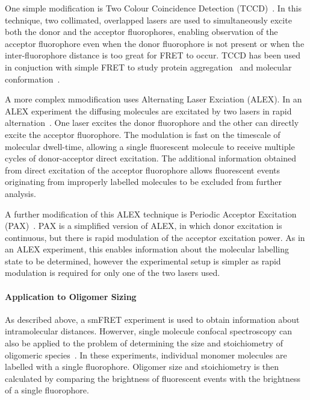 One simple modification is Two Colour Coincidence Detection (TCCD)~\cite{orte06, orte10}. In this technique, two collimated, overlapped lasers are used to simultaneously excite both the donor and the acceptor fluorophores, enabling observation of the acceptor fluorophore even when the donor fluorophore is not present or when the inter-fluorophore distance is too great for FRET to occur. TCCD has been used in conjuction with simple FRET to study protein aggregation~\cite{cremades2012} and molecular conformation~\cite{Ye2012}.  

A more complex mmodification uses Alternating Laser Exciation (ALEX). In an ALEX experiment the diffusing molecules are excitated by two lasers in rapid alternation~\cite{kapanidis05}. One laser excites the donor fluorophore and the other can directly excite the acceptor fluorophore. The modulation is fast on the timescale of molecular dwell-time, allowing a single fluorescent molecule to receive multiple cycles of donor-acceptor direct excitation. The additional information obtained from direct excitation of the acceptor fluorophore allows fluorescent events originating from improperly labelled molecules to be excluded from further analysis. 

A further modification of this ALEX technique is Periodic Acceptor Excitation (PAX)~\cite{doose07}. PAX is a simplified version of ALEX, in which donor excitation is continuous, but there is rapid modulation of the acceptor excitation power. As in an ALEX experiment, this enables information about the molecular labelling state to be determined, however the experimental setup is simpler as rapid modulation is required for only one of the two lasers used.

\paragraph{Application to Oligomer Sizing}
As described above, a smFRET experiment is used to obtain information about intramolecular distances. Howerver, single molecule confocal spectroscopy can also be applied to the problem of determining the size and stoichiometry of oligomeric species~\cite{orte10, cremades2012}. In these experiments, individual monomer molecules are labelled with a single fluorophore. Oligomer size and stoichiometry is then calculated by comparing the brightness of fluorescent events with the brightness of a single fluorophore.



